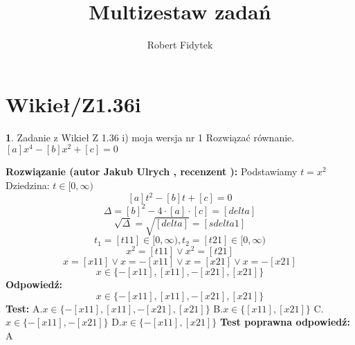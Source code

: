 \documentclass[12pt, a4paper]{article}
\title{Multizestaw zadań}
\author{Robert Fidytek}
\date{}
\theoremstyle{definition} %
\newtheorem{zad}{}
\newcommand{\kategoria}[1]{\section{#1}} %
\newcommand{\zadStart}[1]{\begin{zad}#1\newline} %
\newcommand{\zadStop}{\end{zad}}   %
\newcommand{\rozwStart}[2]{\noindent \textbf{Rozwiązanie (autor #1 , recenzent #2): }\newline} %
\newcommand{\rozwStop}{\newline}                                            %
\newcommand{\odpStart}{\noindent \textbf{Odpowiedź:}\newline}    %
\newcommand{\odpStop}{\newline}                                             %
\newcommand{\testStart}{\noindent \textbf{Test:}\newline} %
\newcommand{\testStop}{\newline} %
\newcommand{\kluczStart}{\noindent \textbf{Test poprawna odpowiedź:}\newline} %
\newcommand{\kluczStop}{\newline} %
\begin{document}
\maketitle


\kategoria{Wikieł/Z1.36i}
\zadStart{Zadanie z Wikieł Z 1.36 i) moja wersja nr 1}
Rozwiązać równanie. $[a]x^{4}-[b]x^{2}+[c]=0$
\zadStop
\rozwStart{Jakub Ulrych}{}
Podstawiamy $t=x^{2}$\\
Dziedzina: $t\in[0,\infty)$
$$[a]t^{2}-[b]t+[c]=0$$
$$\Delta=[b]^{2}-4\cdot[a]\cdot[c]=[delta]$$
$$\sqrt{\Delta}=\sqrt{[delta]}=[sdelta1]$$
$$t_{1}=[t11]\in[0,\infty),t_{2}=[t21]\in[0,\infty)$$
$$x^{2}=[t11]\vee x^{2}=[t21]$$
$$x=[x11]\vee x=-[x11]\vee x=[x21]\vee x=-[x21]$$
$$x\in\{-[x11],[x11],-[x21],[x21]\}$$
\rozwStop
\odpStart
$$x\in\{-[x11],[x11],-[x21],[x21]\}$$
\odpStop
\testStart
A.$x\in\{-[x11],[x11],-[x21],[x21]\}$
B.$x\in\{[x11],[x21]\}$
C.$x\in\{-[x11],-[x21]\}$
D.$x\in\{-[x11],[x21]\}$
\testStop
\kluczStart
A
\kluczStop
\end{document}
